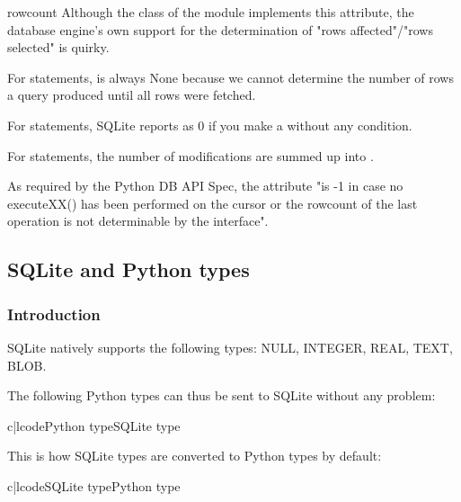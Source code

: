 \begin{memberdesc}{rowcount}
  Although the  class of the  module implements this
  attribute, the database engine's own support for the determination of "rows
  affected"/"rows selected" is quirky.

  For  statements,  is always None because we cannot
  determine the number of rows a query produced until all rows were fetched.

  For  statements, SQLite reports  as 0 if you make a
   without any condition.

  For  statements, the number of modifications are summed
  up into .

  As required by the Python DB API Spec, the  attribute "is -1
  in case no executeXX() has been performed on the cursor or the rowcount
  of the last operation is not determinable by the interface".
\end{memberdesc}

\subsection{SQLite and Python types\label{sqlite3-Types}}

\subsubsection{Introduction}

SQLite natively supports the following types: NULL, INTEGER, REAL, TEXT, BLOB.

The following Python types can thus be sent to SQLite without any problem:

\begin{tableii}  {c|l}{code}{Python type}{SQLite type}
\end{tableii}

This is how SQLite types are converted to Python types by default:

\begin{tableii}  {c|l}{code}{SQLite type}{Python type}
\end{tableii}

